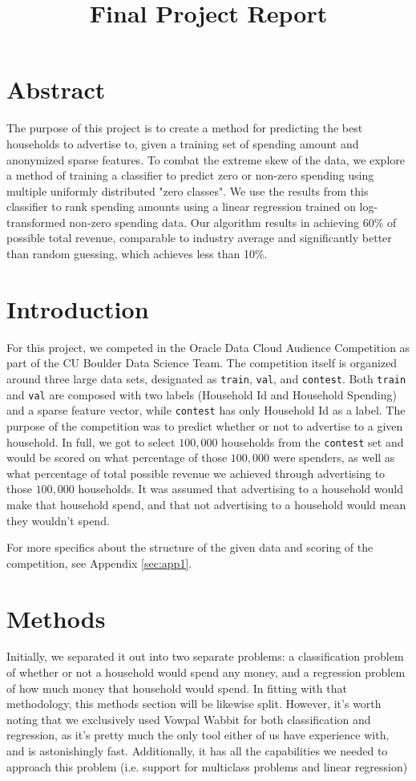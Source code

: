 \documentclass{article}
\title{Final Project Report}
\begin{document}
 
\section*{Abstract}
The purpose of this project is to create a method for predicting the best households to advertise to, given a training set of spending amount and anonymized sparse features. To combat the extreme skew of the data, we explore a method of training a classifier to predict zero or non-zero spending using multiple uniformly distributed "zero classes". We use the results from this classifier to rank spending amounts using a linear regression trained on log-transformed non-zero spending data. Our algorithm results in achieving 60\% of possible total revenue, comparable to industry average and significantly better than random guessing, which achieves less than 10\%. 


\section*{Introduction}
For this project, we competed in the Oracle Data Cloud Audience Competition \cite{codata_oracle_2016} as part of the CU Boulder Data Science Team. The competition itself is organized around three large data sets, designated as \texttt{train}, \texttt{val}, and \texttt{contest}. Both \texttt{train} and \texttt{val} are composed with two labels (Household Id and Household Spending) and a sparse feature vector, while \texttt{contest} has only Household Id as a label. The purpose of the competition was to predict whether or not to advertise to a given household. In full, we got to select $100,000$ households from the \texttt{contest} set and would be scored on what percentage of those $100,000$ were spenders, as well as what percentage of total possible revenue we achieved through advertising to those $100,000$ households. It was assumed that advertising to a household would make that household spend, and that not advertising to a household would mean they wouldn't spend. 

For more specifics about the structure of the given data and scoring of the competition, see Appendix \ref{sec:app1}.

\section*{Methods}
Initially, we separated it out into two separate problems: a classification problem of whether or not a household would spend any money, and a regression problem of how much money that household would spend. In fitting with that methodology, this methods section will be likewise split. However, it's worth noting that we exclusively used Vowpal Wabbit \cite{langford_johnlangford/vowpal_wabbit_????} for both classification and regression, as it's pretty much the only tool either of us have experience with, and is astonishingly fast. Additionally, it has all the capabilities we needed to approach this problem (i.e. support for multiclass problems and linear regression)
\end{document}
